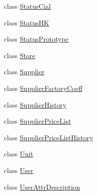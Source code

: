 \begin{DoxyCompactItemize}
\item 
class \mbox{\hyperlink{class_h_k_supply_1_1_models_1_1_status_cial}{Status\+Cial}}
\item 
class \mbox{\hyperlink{class_h_k_supply_1_1_models_1_1_status_h_k}{Status\+HK}}
\item 
class \mbox{\hyperlink{class_h_k_supply_1_1_models_1_1_status_prototype}{Status\+Prototype}}
\item 
class \mbox{\hyperlink{class_h_k_supply_1_1_models_1_1_store}{Store}}
\item 
class \mbox{\hyperlink{class_h_k_supply_1_1_models_1_1_supplier}{Supplier}}
\item 
class \mbox{\hyperlink{class_h_k_supply_1_1_models_1_1_supplier_factory_coeff}{Supplier\+Factory\+Coeff}}
\item 
class \mbox{\hyperlink{class_h_k_supply_1_1_models_1_1_supplier_history}{Supplier\+History}}
\item 
class \mbox{\hyperlink{class_h_k_supply_1_1_models_1_1_supplier_price_list}{Supplier\+Price\+List}}
\item 
class \mbox{\hyperlink{class_h_k_supply_1_1_models_1_1_supplier_price_list_history}{Supplier\+Price\+List\+History}}
\item 
class \mbox{\hyperlink{class_h_k_supply_1_1_models_1_1_unit}{Unit}}
\item 
class \mbox{\hyperlink{class_h_k_supply_1_1_models_1_1_user}{User}}
\item 
class \mbox{\hyperlink{class_h_k_supply_1_1_models_1_1_user_attr_description}{User\+Attr\+Description}}
\end{DoxyCompactItemize}
